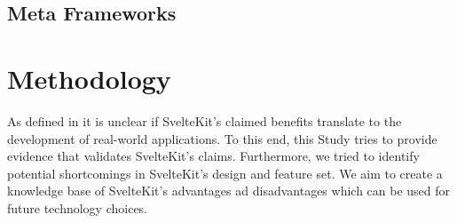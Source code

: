 \subsection{Meta Frameworks}



\section{Methodology}
\label{sec:methodology}







As defined in  it is unclear if SvelteKit's claimed benefits translate to the development of real-world applications. To this end, this Study tries to provide evidence that validates SvelteKit's claims. Furthermore, we tried to identify potential shortcomings in SvelteKit's design and feature set. We aim to create a knowledge base of SvelteKit's advantages ad disadvantages which can be used for future technology  choices.

